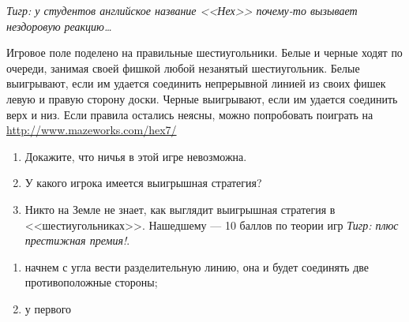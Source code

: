 \begin{problem}[<<Шестиугольники>>]\par

{\it Тигр: у студентов английское название <<Нех>> почему-то вызывает нездоровую реакцию\ldots }\par

Игровое поле поделено на правильные шестиугольники. Белые и черные ходят по очереди, занимая своей фишкой любой незанятый шестиугольник. Белые выигрывают, если им удается соединить непрерывной линией из своих фишек левую и правую сторону доски. Черные выигрывают, если им удается соединить верх и низ. Если правила остались неясны, можно попробовать поиграть на \url{http://www.mazeworks.com/hex7/}\par



\begin{enumerate}
\item 	Докажите, что ничья в этой игре невозможна.\par
\item 	У какого игрока имеется выигрышная стратегия?\par
\item 	Никто на Земле не знает, как выглядит выигрышная стратегия в <<шестиугольниках>>. Нашедшему --- 10 баллов по теории игр {\it Тигр: плюс престижная премия!}.\par
\end{enumerate}



\begin{sol}
\begin{enumerate}
\item начнем с угла вести разделительную линию, она и будет соединять две противоположные стороны;
\item у первого
\end{enumerate}
\end{sol}
\end{problem}










